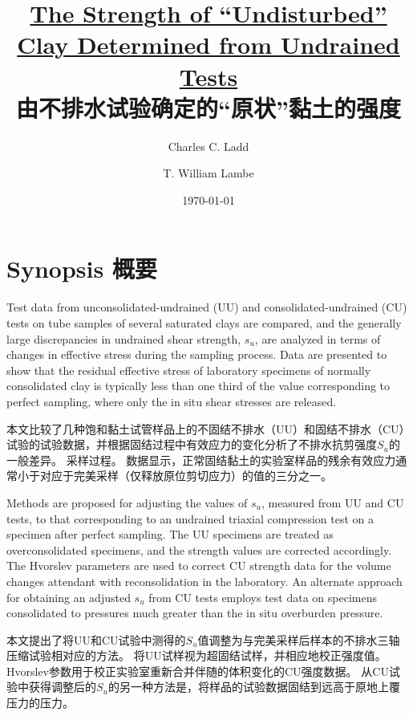 \documentclass{bilidoc}
\title{\textbf{\href{http://dx.doi.org/10.1520/STP30011S}{The Strength of “Undisturbed” Clay Determined from Undrained Tests}\\由不排水试验确定的“原状”黏土的强度}}
\date{\today}
\author{Charles C. Ladd \and T. William Lambe}
\begin{document}
\maketitle

\section*{Synopsis 概要}

\begin{paracol}{2}

    Test data from unconsolidated-undrained (UU) and consolidated-undrained (CU) tests on tube samples of several saturated clays are compared, and the generally large discrepancies in undrained shear strength, $s_u$, are analyzed in terms of changes in effective stress during the sampling process. Data are presented to show that the residual effective stress of laboratory specimens of normally consolidated clay is typically less than one third of the value corresponding to perfect sampling, where only the in situ shear stresses are released.
    
    \switchcolumn

    本文比较了几种饱和黏土试管样品上的不固结不排水（UU）和固结不排水（CU）试验的试验数据，并根据固结过程中有效应力的变化分析了不排水抗剪强度$S_u$的一般差异。 采样过程。 数据显示，正常固结黏土的实验室样品的残余有效应力通常小于对应于完美采样（仅释放原位剪切应力）的值的三分之一。

    \switchcolumn*

    Methods are proposed for adjusting the values of $s_u$, measured from UU and CU tests, to that corresponding to an undrained triaxial compression test on a specimen after perfect sampling. The UU specimens are treated as overconsolidated specimens, and the strength values are corrected accordingly. The Hvorslev parameters are used to correct CU strength data for the volume changes attendant with reconsolidation in the laboratory. An alternate approach for obtaining an adjusted $s_u$ from CU tests employs test data on specimens consolidated to pressures much greater than the in situ overburden pressure.

    \switchcolumn
        
    本文提出了将UU和CU试验中测得的$S_u$值调整为与完美采样后样本的不排水三轴压缩试验相对应的方法。 将UU试样视为超固结试样，并相应地校正强度值。Hvorslev参数用于校正实验室重新合并伴随的体积变化的CU强度数据。 从CU试验中获得调整后的$S_u$的另一种方法是，将样品的试验数据固结到远高于原地上覆压力的压力。


\end{paracol}
\end{document}
